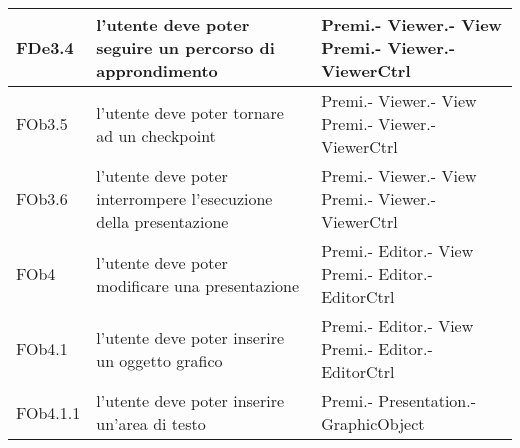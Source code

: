 \begin{longtable}{|l|p{5cm}|p{4cm}|}
\hline
FDe3.4 & l'utente deve poter seguire un percorso di approndimento & Premi.- \linebreak Viewer.- \linebreak View \linebreak Premi.- \linebreak Viewer.- \linebreak ViewerCtrl \linebreak \\
\hline
FOb3.5 & l'utente deve poter tornare ad un checkpoint & Premi.- \linebreak Viewer.- \linebreak View \linebreak Premi.- \linebreak Viewer.- \linebreak ViewerCtrl \linebreak \\
\hline
FOb3.6 & l'utente deve poter interrompere l'esecuzione della presentazione & Premi.- \linebreak Viewer.- \linebreak View \linebreak Premi.- \linebreak Viewer.- \linebreak ViewerCtrl \linebreak \\
\hline
FOb4 & l'utente deve poter modificare una presentazione & Premi.- \linebreak Editor.- \linebreak View \linebreak Premi.- \linebreak Editor.- \linebreak EditorCtrl \linebreak \\
\hline
FOb4.1 & l'utente deve poter inserire un oggetto grafico & Premi.- \linebreak Editor.- \linebreak View \linebreak Premi.- \linebreak Editor.- \linebreak EditorCtrl \linebreak \\
\hline
FOb4.1.1 & l'utente deve poter inserire un'area di testo & Premi.- \linebreak Presentation.- \linebreak GraphicObject \linebreak \\

\end{longtable}
